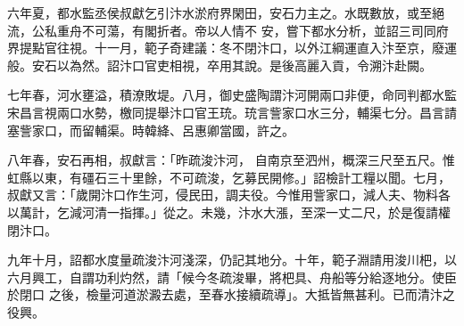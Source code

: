 \begin{pinyinscope}
 六年夏，都水監丞侯叔獻乞引汴水淤府界閑田，安石力主之。水既數放，或至絕流，公私重舟不可蕩，有閣折者。帝以人情不
 安，嘗下都水分析，並詔三司同府界提點官往視。十一月，範子奇建議：冬不閉汴口，以外江綱運直入汴至京，廢運般。安石以為然。詔汴口官吏相視，卒用其說。是後高麗入貢，令溯汴赴闕。



 七年春，河水壅溢，積潦敗堤。八月，御史盛陶謂汴河開兩口非便，命同判都水監宋昌言視兩口水勢，檄同提舉汴口官王珫。珫言訾家口水三分，輔渠七分。昌言請塞訾家口，而留輔渠。時韓絳、呂惠卿當國，許之。



 八年春，安石再相，叔獻言：「昨疏浚汴河，
 自南京至泗州，概深三尺至五尺。惟虹縣以東，有礓石三十里餘，不可疏浚，乞募民開修。」詔檢計工糧以聞。七月，叔獻又言：「歲開汴口作生河，侵民田，調夫役。今惟用訾家口，減人夫、物料各以萬計，乞減河清一指揮。」從之。未幾，汴水大漲，至深一丈二尺，於是復請權閉汴口。



 九年十月，詔都水度量疏浚汴河淺深，仍記其地分。十年，範子淵請用浚川杷，以六月興工，自謂功利灼然，請「候今冬疏浚畢，將杷具、舟船等分給逐地分。使臣於閉口
 之後，檢量河道淤澱去處，至春水接續疏導」。大抵皆無甚利。已而清汴之役興。



\end{pinyinscope}